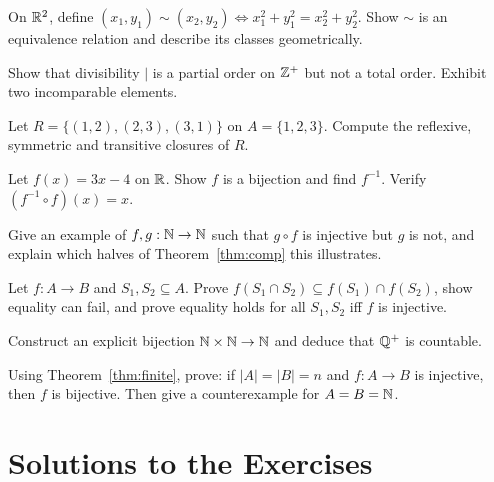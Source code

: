 \begin{exercise}{\medium}
On $\mathbb{R}^2$, define $(x_1,y_1) \sim (x_2,y_2) \iff x_1^2 + y_1^2 = x_2^2 +
y_2^2$. Show $\sim$ is an equivalence relation and describe its classes
geometrically.
\end{exercise}

\begin{exercise}{\medium}
Show that divisibility $\mid$ is a partial order on $\mathbb{Z}^{+}$ but not a total
order. Exhibit two incomparable elements.
\end{exercise}

\begin{exercise}{\medium}
Let $R = \{(1,2),(2,3),(3,1)\}$ on $A=\{1,2,3\}$. Compute the reflexive,
symmetric and transitive closures of $R$.
\end{exercise}

\begin{exercise}{\medium}
Let $f(x) = 3x - 4$ on $\mathbb{R}$. Show $f$ is a bijection and find $f^{-1}$.
Verify $(f^{-1} \circ f)(x) = x$.
\end{exercise}

\begin{exercise}{\medium}
Give an example of $f, g : \mathbb{N} \to \mathbb{N}$ such that $g \circ f$ is injective but
$g$ is not, and explain which halves of Theorem~\ref{thm:comp} this
illustrates.
\end{exercise}

\begin{exercise}{\hard}
Let $f : A \to B$ and $S_1, S_2 \subseteq A$. Prove
$f(S_1 \cap S_2) \subseteq f(S_1) \cap f(S_2)$, show equality can fail, and
prove equality holds for all $S_1, S_2$ iff $f$ is injective.
\end{exercise}

\begin{exercise}{\hard}
Construct an explicit bijection $\mathbb{N} \times \mathbb{N} \to \mathbb{N}$ and deduce that
$\mathbb{Q}^{+}$ is countable.
\end{exercise}

\begin{exercise}{\hard}
Using Theorem~\ref{thm:finite}, prove: if $|A| = |B| = n$ and
$f : A \to B$ is injective, then $f$ is bijective. Then give a counterexample
for $A = B = \mathbb{N}$.
\end{exercise}

\section*{Solutions to the Exercises}

